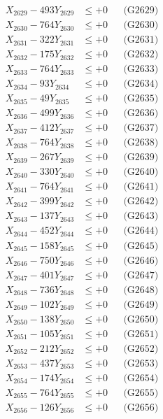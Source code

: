 \documentclass[a4paper,10pt]{article}
\begin{document}
{\begin{align}
X_{2629} - 493Y_{2629} &\leq +0 && \text{(G2629)} \\
X_{2630} - 764Y_{2630} &\leq +0 && \text{(G2630)} \\
\allowbreak
X_{2631} - 322Y_{2631} &\leq +0 && \text{(G2631)} \\
X_{2632} - 175Y_{2632} &\leq +0 && \text{(G2632)} \\
X_{2633} - 764Y_{2633} &\leq +0 && \text{(G2633)} \\
X_{2634} - 93Y_{2634} &\leq +0 && \text{(G2634)} \\
X_{2635} - 49Y_{2635} &\leq +0 && \text{(G2635)} \\
X_{2636} - 499Y_{2636} &\leq +0 && \text{(G2636)} \\
X_{2637} - 412Y_{2637} &\leq +0 && \text{(G2637)} \\
X_{2638} - 764Y_{2638} &\leq +0 && \text{(G2638)} \\
X_{2639} - 267Y_{2639} &\leq +0 && \text{(G2639)} \\
X_{2640} - 330Y_{2640} &\leq +0 && \text{(G2640)} \\
\allowbreak
X_{2641} - 764Y_{2641} &\leq +0 && \text{(G2641)} \\
X_{2642} - 399Y_{2642} &\leq +0 && \text{(G2642)} \\
X_{2643} - 137Y_{2643} &\leq +0 && \text{(G2643)} \\
X_{2644} - 452Y_{2644} &\leq +0 && \text{(G2644)} \\
X_{2645} - 158Y_{2645} &\leq +0 && \text{(G2645)} \\
X_{2646} - 750Y_{2646} &\leq +0 && \text{(G2646)} \\
X_{2647} - 401Y_{2647} &\leq +0 && \text{(G2647)} \\
X_{2648} - 736Y_{2648} &\leq +0 && \text{(G2648)} \\
X_{2649} - 102Y_{2649} &\leq +0 && \text{(G2649)} \\
X_{2650} - 138Y_{2650} &\leq +0 && \text{(G2650)} \\
\allowbreak
X_{2651} - 105Y_{2651} &\leq +0 && \text{(G2651)} \\
X_{2652} - 212Y_{2652} &\leq +0 && \text{(G2652)} \\
X_{2653} - 437Y_{2653} &\leq +0 && \text{(G2653)} \\
X_{2654} - 174Y_{2654} &\leq +0 && \text{(G2654)} \\
X_{2655} - 764Y_{2655} &\leq +0 && \text{(G2655)} \\
X_{2656} - 126Y_{2656} &\leq +0 && \text{(G2656)} \\

\end{align}}
\end{document}
